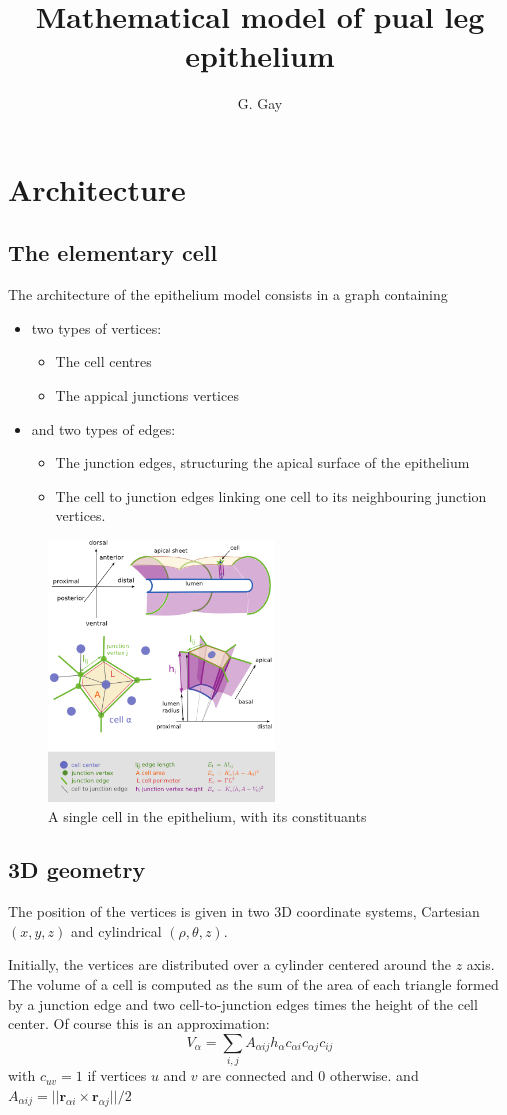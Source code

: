 \documentclass[12pt]{article}
\title{Mathematical model of pual leg epithelium}
\author{G. Gay}
\date{}
\begin{document}
\section{Architecture}


\subsection{The elementary cell}

The architecture of the epithelium model consists in a graph containing
\begin{itemize}
\item two types of vertices:
  \begin{itemize}
  \item The cell centres
  \item The appical junctions vertices
  \end{itemize}
\item and two types of edges:
  \begin{itemize}
  \item The junction edges, structuring the apical surface of the
    epithelium
  \item The cell to junction edges linking one cell to its
    neighbouring junction vertices.
  \end{itemize}
\end{itemize}

\begin{figure}[htbp]
  \centering
  \includegraphics[width=6cm]{one_cell}
  \caption{A single cell in the epithelium, with its constituants}
  \label{fig:single_cell}
\end{figure}

\subsection{3D geometry}

The position of the vertices is given in two 3D coordinate systems,
Cartesian $(x, y, z)$ and cylindrical $(\rho, \theta, z)$.

Initially, the vertices are distributed over a cylinder centered around
the $z$ axis. The volume of a cell is computed as the sum of the area
of each triangle formed by a junction edge and two cell-to-junction
edges times the height of the cell center. Of course this is an
approximation:
$$
V_\alpha = \sum_{i,j} A_{\alpha ij} h_\alpha c_{\alpha i} c_{\alpha j} c_{ij}
$$
with $c_{uv} = 1$ if vertices $u$ and $v$ are connected and 0 otherwise.  
and $A_{\alpha ij} = || \mathbf{r}_{\alpha i} \times \mathbf{ r}_{\alpha j} || / 2 $
\end{document}
